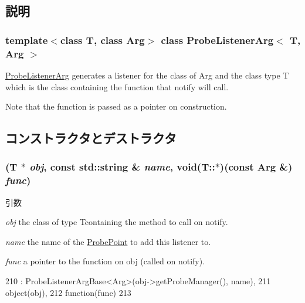 \subsection{説明}
\subsubsection*{template$<$class T, class Arg$>$ class ProbeListenerArg$<$ T, Arg $>$}

\hyperlink{classProbeListenerArg}{ProbeListenerArg} generates a listener for the class of Arg and the class type T which is the class containing the function that notify will call.

Note that the function is passed as a pointer on construction. 

\subsection{コンストラクタとデストラクタ}
\hypertarget{classProbeListenerArg_a2697379aed3ebe21258278e8f06ae6ac}{
\subsubsection[{ProbeListenerArg}]{ (T $\ast$ {\em obj}, \/  const std::string \& {\em name}, \/  void(T::$\ast$)(const Arg \&) {\em func})}}
\label{classProbeListenerArg_a2697379aed3ebe21258278e8f06ae6ac}

\begin{DoxyParams}{引数}
\item[{\em obj}]the class of type Tcontaining the method to call on notify. \item[{\em name}]the name of the \hyperlink{classProbePoint}{ProbePoint} to add this listener to. \item[{\em func}]a pointer to the function on obj (called on notify). \end{DoxyParams}



\begin{DoxyCode}
210         : ProbeListenerArgBase<Arg>(obj->getProbeManager(), name),
211           object(obj),
212           function(func)
213     {}
\end{DoxyCode}


